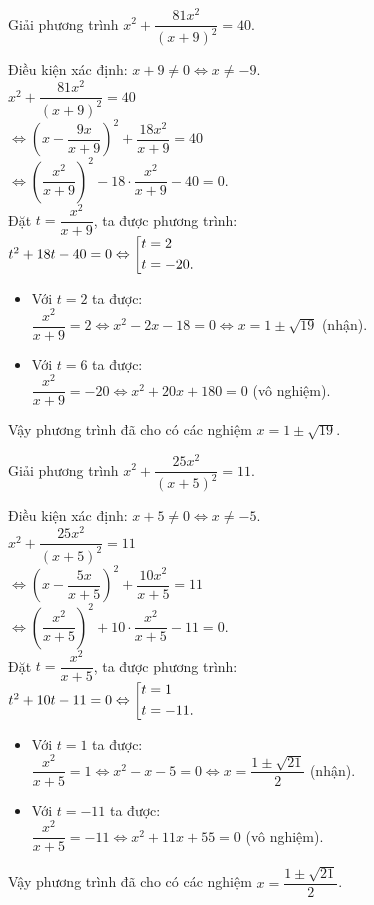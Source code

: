 \begin{bt}%
	Giải phương trình $x^2 + \dfrac{81x^2}{(x+9)^2} = 40$.
	\loigiai
	{
		Điều kiện xác định: $x + 9 \neq 0 \Leftrightarrow x \neq -9$.\\
		\hspace*{0.6cm} $x^2 + \dfrac{81x^2}{(x + 9)^2} = 40$\\
		$\Leftrightarrow \left(x - \dfrac{9x}{x+9}\right)^2 + \dfrac{18x^2}{x+9} = 40$\\
		$\Leftrightarrow \left( \dfrac{x^2}{x+9} \right)^2 - 18 \cdot \dfrac{x^2}{x+9} - 40 = 0$.\\
		Đặt $t = \dfrac{x^2}{x+9}$, ta được phương trình:\\
		\hspace*{0.6cm} $t^2 + 18t - 40 = 0 \Leftrightarrow \left[\begin{aligned}& t = 2 \\& t = -20.\end{aligned}\right.$
		\begin{itemize}
			\item Với $t = 2$ ta được:\\
			$\dfrac{x^2}{x+9} = 2 \Leftrightarrow x^2 - 2x - 18 = 0 \Leftrightarrow x = 1 \pm \sqrt{19}$ (nhận).
			\item Với $t = 6$ ta được:\\
			$\dfrac{x^2}{x+9} = -20 \Leftrightarrow x^2 + 20x + 180 = 0$ (vô nghiệm).
		\end{itemize}
		Vậy phương trình đã cho có các nghiệm $x = 1 \pm \sqrt{19}$.
	}
\end{bt}


\begin{bt}%
	Giải phương trình $x^2 + \dfrac{25x^2}{(x+5)^2} = 11$.
	\loigiai
	{
		Điều kiện xác định: $x + 5 \neq 0 \Leftrightarrow x \neq -5$.\\
		\hspace*{0.6cm} $x^2 + \dfrac{25x^2}{(x+5)^2} = 11$\\
		$\Leftrightarrow \left(x - \dfrac{5x}{x+5}\right)^2 + \dfrac{10x^2}{x+5} = 11$\\
		$\Leftrightarrow \left( \dfrac{x^2}{x+5} \right)^2 + 10 \cdot \dfrac{x^2}{x+5} - 11 = 0$.\\
		Đặt $t = \dfrac{x^2}{x+5}$, ta được phương trình:\\
		\hspace*{0.6cm}$t^2 + 10t - 11 = 0 \Leftrightarrow \left[\begin{aligned}& t = 1 \\& t = -11.\end{aligned}\right.$
		\begin{itemize}
			\item Với $t = 1$ ta được:\\
			$\dfrac{x^2}{x+5} = 1 \Leftrightarrow x^2 - x - 5 = 0 \Leftrightarrow x = \dfrac{1 \pm \sqrt{21}}{2}$ (nhận).
			\item Với $t = -11$ ta được:\\
			$\dfrac{x^2}{x+5} = -11 \Leftrightarrow x^2 + 11x + 55 = 0$ (vô nghiệm).
		\end{itemize}
		Vậy phương trình đã cho có các nghiệm $x = \dfrac{1 \pm \sqrt{21}}{2}$.
	}
\end{bt}


